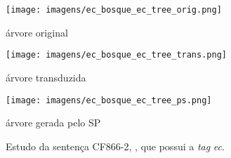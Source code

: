\begin{figure}[!hb]
    \centering
    \begin{minipage}{.45\textwidth}
        \texttt{[image: imagens/ec\_bosque\_ec\_tree\_orig.png]}
        \caption{árvore original}
    \end{minipage}
    \begin{minipage}{.45\textwidth}
        \texttt{[image: imagens/ec\_bosque\_ec\_tree\_trans.png]}
        \caption{árvore transduzida}
    \end{minipage}
    \begin{minipage}{.45\textwidth}
        \texttt{[image: imagens/ec\_bosque\_ec\_tree\_ps.png]}
        \caption{árvore gerada pelo SP}
    \end{minipage}
    \caption[Estudo de caso BOSQUE - Sentença transduzida com \textit{ec}, e \textit{cu}]{Estudo da sentença CF866-2, , que possui a \textit{tag} \textit{ec}.}
    \label{fig:ec_bosque_ec_tree}
\end{figure}